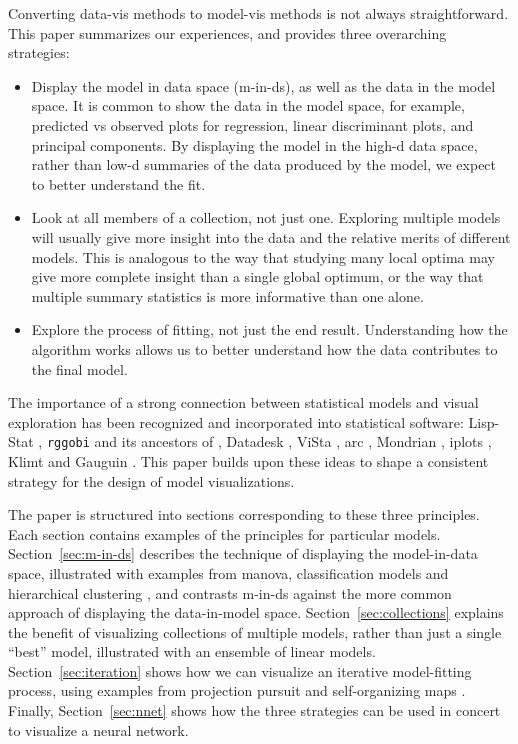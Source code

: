 \documentclass[preprint]{imsart}
\begin{document}
Converting data-vis methods to model-vis methods is not always straightforward. This paper summarizes our experiences, and provides three overarching strategies:

\begin{itemize}
\item Display the model in data space (m-in-ds), as well as the
  data in the model space. It is common to show the data in the model
  space, for example, predicted vs observed plots for regression,
  linear discriminant plots, and principal components.  By displaying
  the model in the high-d data space, rather than low-d summaries of the
  data produced by the model, we expect to better understand the fit.

\item Look at all members of a collection, not just
  one.  Exploring multiple models will usually give more insight into
  the data and the relative merits of different models. This is
  analogous to the way that studying many local optima may give more
  complete insight than a single global optimum, or the way that
  multiple summary statistics is more informative than one alone.

\item Explore the process of fitting, not just the
  end result.  Understanding how the algorithm works allows us to
  better understand how the data contributes to the final model.

\end{itemize}

The importance of a strong connection between statistical models and visual exploration has been recognized and incorporated into statistical software: Lisp-Stat \citep{tierney:1990}, {\tt rggobi} and its ancestors of \citep{swayne:1991}, Datadesk \citep{velleman:1992}, ViSta \citep{young:1993}, {\sc arc} \citep{cook:1998}, Mondrian \citep{theus:2003}, iplots \citep{iplots}, Klimt \citep{urbanek:2002a} and Gauguin \citep{gribov:2007}. This paper builds upon these ideas to shape a consistent strategy for the design of model visualizations.

The paper is structured into sections corresponding to these three principles. Each section contains examples of the principles for particular models. Section~\ref{sec:m-in-ds} describes the technique of displaying the model-in-data space, illustrated with examples from {\sc manova}, classification models and hierarchical clustering \citep{JW02}, and contrasts m-in-ds against the more common approach of displaying the data-in-model space. Section~\ref{sec:collections} explains the benefit of visualizing collections of multiple models, rather than just a single ``best'' model, illustrated with an ensemble of linear models. Section~\ref{sec:iteration} shows how we can visualize an iterative model-fitting process, using examples from projection pursuit \citep{friedman:1974,huber:1985} and self-organizing maps \citep{kohonen:2001}. Finally, Section~\ref{sec:nnet} shows how the three strategies can be used in concert to visualize a neural network.
\end{document}
